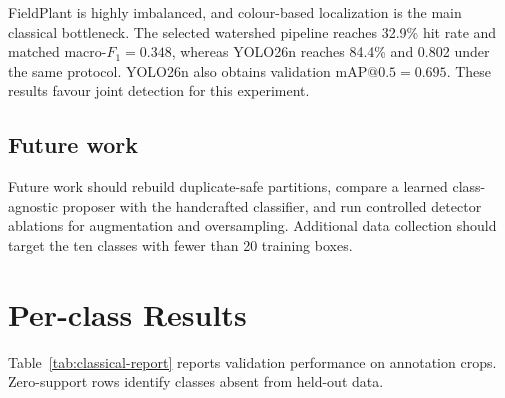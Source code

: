 \documentclass[a4paper,8pt]{article}
\begin{document}
FieldPlant is highly imbalanced, and colour-based localization is the main classical bottleneck.
The selected watershed pipeline reaches 32.9\% hit rate and matched macro-$F_1=0.348$, whereas
YOLO26n reaches 84.4\% and 0.802 under the same protocol. YOLO26n also obtains validation
$\mathrm{mAP}@0.5=0.695$. These results favour joint detection for this experiment.

\subsection{Future work}

Future work should rebuild duplicate-safe partitions, compare a learned class-agnostic proposer
with the handcrafted classifier, and run controlled detector ablations for augmentation and
oversampling. Additional data collection should target the ten classes with fewer than 20
training boxes.

\clearpage
\appendix
\renewcommand{\thesection}{Appendix~\Alph{section}}
\section{Per-class Results}
\label{app:perclass}

Table~\ref{tab:classical-report} reports validation performance on annotation crops. Zero-support
rows identify classes absent from held-out data.
\end{document}
